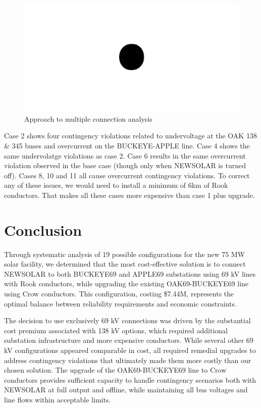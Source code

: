 \documentclass[conference]{IEEEtran}
\begin{document}
\begin{figure}[h]
	\centering
	\includegraphics[width=1\linewidth]{figures/fig1}
	\caption{Approach to multiple connection analysis}
	\label{fig:multi}
\end{figure}


Case 2 shows four contingency violations related to undervoltage at the OAK 138 \& 345 buses and overcurrent on the BUCKEYE-APPLE line. Case 4 shows the same undervolatge violations as case 2. Case 6 results in the same overcurrent violation observed in the base case (though only when NEWSOLAR is turned off). Cases 8, 10 and 11 all cause overcurrent contingency violations. To correct any of these issues, we would need to install a minimum of 6km of Rook conductors. That makes all these cases more expensive than case 1 plus upgrade.
\section{Conclusion}
Through systematic analysis of 19 possible configurations for the new 75 MW solar facility, we determined that the most cost-effective solution is to connect NEWSOLAR to both BUCKEYE69 and APPLE69 substations using 69 kV lines with Rook conductors, while upgrading the existing OAK69-BUCKEYE69 line using Crow conductors. This configuration, costing \$7.44M, represents the optimal balance between reliability requirements and economic constraints.

The decision to use exclusively 69 kV connections was driven by the substantial cost premium associated with 138 kV options, which required additional substation infrastructure and more expensive conductors. While several other 69 kV configurations appeared comparable in cost, all required remedial upgrades to address contingency violations that ultimately made them more costly than our chosen solution. The upgrade of the OAK69-BUCKEYE69 line to Crow conductors provides sufficient capacity to handle contingency scenarios both with NEWSOLAR at full output and offline, while maintaining all bus voltages and line flows within acceptable limits.
\end{document}
